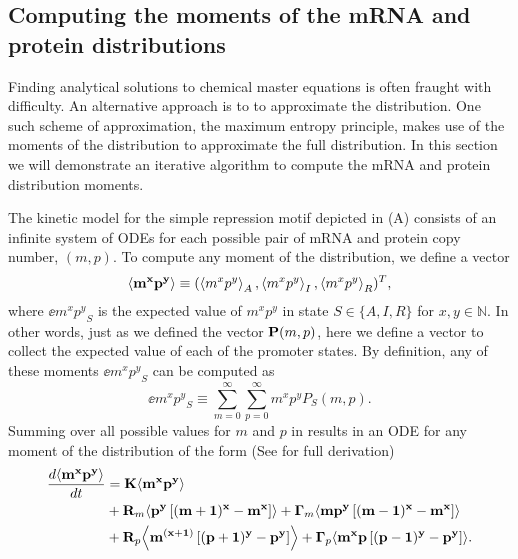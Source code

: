 \subsection{Computing the moments of the mRNA and protein distributions}
\label{sec_moments}

Finding analytical solutions to chemical master equations is often fraught with
difficulty. An alternative approach is to to approximate the distribution. One
such scheme of approximation, the maximum entropy principle, makes use of the
moments of the distribution to approximate the full distribution. In this
section we will demonstrate an iterative algorithm to compute the mRNA and
protein distribution moments.

The kinetic model for the simple repression motif depicted in
(A) consists of an infinite system of ODEs for each
possible pair of mRNA and protein copy number, $(m, p)$. To compute any moment
of the distribution, we define a vector
\begin{equation}
	\left\langle \mathbf{m^x p^y} \right\rangle \equiv (\left\langle m^x p^y \right\rangle_A, \left\langle m^x p^y \right\rangle_I, \left\langle m^x p^y \right\rangle_R)^T,
\end{equation}
where $\ee{m^x p^y}_S$ is the expected value of $m^x p^y$ in state $S \in \{A,
I, R\}$ for $x, y \in \mathbb{N}$. In other words, just as we defined the
vector $\mathbf{P}(m, p)$, here we define a vector to collect the expected value of
each of the promoter states. By definition, any of these moments $\ee{m^x
p^y}_S$ can be computed as
\begin{equation}
  \ee{m^x p^y}_S \equiv \sum_{m=0}^\infty \sum_{p=0}^\infty m^x p^y P_S(m, p).
  \label{eq_mom_def}
\end{equation}
Summing over all possible values for $m$ and $p$ in 
results in an ODE for any moment of the distribution of the form (See
 for full derivation)
\begin{equation}
  \begin{aligned}
    {d{\mathbf{\left\langle m^x p^y \right\rangle}} \over dt} &=
    \mathbf{K} \mathbf{\left\langle m^x p^y \right\rangle}\\
    &+ \mathbf{R}_m \mathbf{\left\langle p^y \left[ (m + 1)^x -m^x \right] \right\rangle}
     + \mathbf{\Gamma}_m \mathbf{\left\langle m p^y \left[ (m - 1)^x - m^x \right] \right\rangle}\\
    &+ \mathbf{R}_p \mathbf{\left\langle m^{(x + 1)} \left[ (p + 1)^y - p^y \right] \right\rangle}
     + \mathbf{\Gamma}_p \mathbf{\left\langle m^x p \left[ (p - 1)^y - p^y \right] \right\rangle}.
    \label{eq_gral_mom}
  \end{aligned}
\end{equation}

